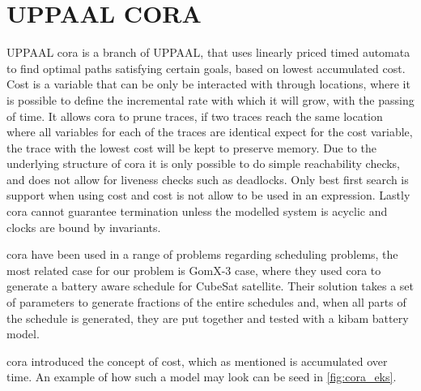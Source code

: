\section{UPPAAL CORA}\label{sec:upp_cora}
UPPAAL \acrfull{cora} is a branch of UPPAAL, that uses linearly priced timed automata to find optimal paths satisfying certain goals, based on lowest accumulated cost\cite{cs_cora}. Cost is a variable that can be only be interacted with through locations, where it is possible to define the incremental rate with which it will grow, with the passing of time. It allows \gls{cora} to prune traces, if two traces reach the same location where all variables for each of the traces are identical expect for the cost variable, the trace with the lowest cost will be kept to preserve memory. Due to the underlying structure of \gls{cora} it is only possible to do simple reachability checks, and does not allow for liveness checks such as deadlocks. Only best first search is support when using cost and cost is not allow to be used in an expression. Lastly \gls{cora} cannot guarantee termination unless the modelled system is acyclic and clocks are bound by invariants.

\Gls{cora} have been used in a range of problems regarding scheduling problems, the most related case for our problem is GomX-3 case, where they used \gls{cora} to generate a battery aware schedule for CubeSat satellite. Their solution takes a set of parameters to generate fractions of the entire schedules and, when all parts of the schedule is generated, they are put together and tested with a \gls{kibam} battery model. 

\Gls{cora} introduced the concept of cost, which as mentioned is accumulated over time. An example of how such a model may look can be seed in \cref{fig:cora_eks}.


